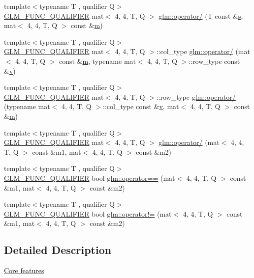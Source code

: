 \begin{DoxyCompactItemize}
\item 
{\footnotesize template$<$typename T , qualifier Q$>$ }\\\hyperlink{setup_8hpp_a33fdea6f91c5f834105f7415e2a64407}{G\+L\+M\+\_\+\+F\+U\+N\+C\+\_\+\+Q\+U\+A\+L\+I\+F\+I\+ER} mat$<$ 4, 4, T, Q $>$ \hyperlink{namespaceglm_a584714fe13d716d288b5825f55cb9bc4}{glm\+::operator/} (T const \&\hyperlink{_s_d_l__opengl_8h_a4af680a6c683f88ed67b76f207f2e6e4}{s}, mat$<$ 4, 4, T, Q $>$ const \&\hyperlink{_s_d_l__opengl__glext_8h_af593500c283bf1a787a6f947f503a5c2}{m})
\item 
{\footnotesize template$<$typename T , qualifier Q$>$ }\\\hyperlink{setup_8hpp_a33fdea6f91c5f834105f7415e2a64407}{G\+L\+M\+\_\+\+F\+U\+N\+C\+\_\+\+Q\+U\+A\+L\+I\+F\+I\+ER} mat$<$ 4, 4, T, Q $>$\+::col\+\_\+type \hyperlink{namespaceglm_add94ecd5b862f66e257ddbbf0baf75d2}{glm\+::operator/} (mat$<$ 4, 4, T, Q $>$ const \&\hyperlink{_s_d_l__opengl__glext_8h_af593500c283bf1a787a6f947f503a5c2}{m}, typename mat$<$ 4, 4, T, Q $>$\+::row\+\_\+type const \&\hyperlink{_s_d_l__opengl_8h_a10a82eabcb59d2fcd74acee063775f90}{v})
\item 
{\footnotesize template$<$typename T , qualifier Q$>$ }\\\hyperlink{setup_8hpp_a33fdea6f91c5f834105f7415e2a64407}{G\+L\+M\+\_\+\+F\+U\+N\+C\+\_\+\+Q\+U\+A\+L\+I\+F\+I\+ER} mat$<$ 4, 4, T, Q $>$\+::row\+\_\+type \hyperlink{namespaceglm_ac06cdd1820160ae6b8e9f720b002df59}{glm\+::operator/} (typename mat$<$ 4, 4, T, Q $>$\+::col\+\_\+type const \&\hyperlink{_s_d_l__opengl_8h_a10a82eabcb59d2fcd74acee063775f90}{v}, mat$<$ 4, 4, T, Q $>$ const \&\hyperlink{_s_d_l__opengl__glext_8h_af593500c283bf1a787a6f947f503a5c2}{m})
\item 
{\footnotesize template$<$typename T , qualifier Q$>$ }\\\hyperlink{setup_8hpp_a33fdea6f91c5f834105f7415e2a64407}{G\+L\+M\+\_\+\+F\+U\+N\+C\+\_\+\+Q\+U\+A\+L\+I\+F\+I\+ER} mat$<$ 4, 4, T, Q $>$ \hyperlink{namespaceglm_acc629aef32528a5a54e77fb86460dbee}{glm\+::operator/} (mat$<$ 4, 4, T, Q $>$ const \&m1, mat$<$ 4, 4, T, Q $>$ const \&m2)
\item 
{\footnotesize template$<$typename T , qualifier Q$>$ }\\\hyperlink{setup_8hpp_a33fdea6f91c5f834105f7415e2a64407}{G\+L\+M\+\_\+\+F\+U\+N\+C\+\_\+\+Q\+U\+A\+L\+I\+F\+I\+ER} bool \hyperlink{namespaceglm_a8bcfe7feeeb780a7ea48046ae4c6cd57}{glm\+::operator==} (mat$<$ 4, 4, T, Q $>$ const \&m1, mat$<$ 4, 4, T, Q $>$ const \&m2)
\item 
{\footnotesize template$<$typename T , qualifier Q$>$ }\\\hyperlink{setup_8hpp_a33fdea6f91c5f834105f7415e2a64407}{G\+L\+M\+\_\+\+F\+U\+N\+C\+\_\+\+Q\+U\+A\+L\+I\+F\+I\+ER} bool \hyperlink{namespaceglm_ae03f4496a0725bb705dbfccd4daebae1}{glm\+::operator!=} (mat$<$ 4, 4, T, Q $>$ const \&m1, mat$<$ 4, 4, T, Q $>$ const \&m2)
\end{DoxyCompactItemize}


\subsection{Detailed Description}
\hyperlink{group__core}{Core features} 